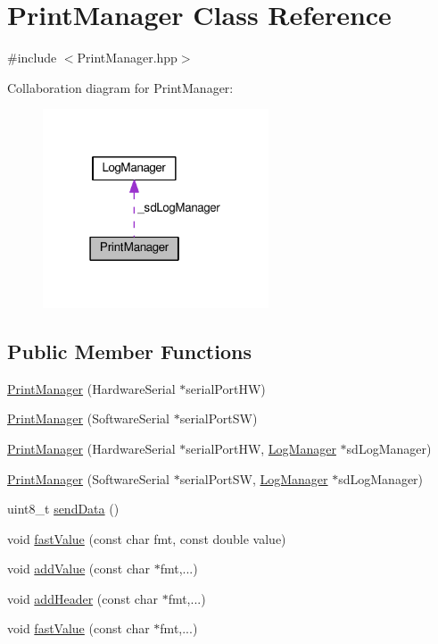 \hypertarget{class_print_manager}{}\section{Print\+Manager Class Reference}
\label{class_print_manager}


{\ttfamily \#include $<$Print\+Manager.\+hpp$>$}



Collaboration diagram for Print\+Manager\+:\nopagebreak
\begin{figure}[H]
\begin{center}
\leavevmode
\includegraphics[width=190pt]{class_print_manager__coll__graph}
\end{center}
\end{figure}
\subsection*{Public Member Functions}
\begin{DoxyCompactItemize}
\item 
\hyperlink{class_print_manager_a587a22b1cc67696f71f5a85bfb130140}{Print\+Manager} (Hardware\+Serial $\ast$serial\+Port\+HW)
\item 
\hyperlink{class_print_manager_ac1212bb44b3c100bd67041d878977058}{Print\+Manager} (Software\+Serial $\ast$serial\+Port\+SW)
\item 
\hyperlink{class_print_manager_a5ac22dd7ed0f35b12cd2b7650e2c8501}{Print\+Manager} (Hardware\+Serial $\ast$serial\+Port\+HW, \hyperlink{class_log_manager}{Log\+Manager} $\ast$sd\+Log\+Manager)
\item 
\hyperlink{class_print_manager_ac1a82b54cdeaf43b3e78ed6eb18c9bc6}{Print\+Manager} (Software\+Serial $\ast$serial\+Port\+SW, \hyperlink{class_log_manager}{Log\+Manager} $\ast$sd\+Log\+Manager)
\item 
uint8\+\_\+t \hyperlink{class_print_manager_a65b6e94eb17c08725d307293c26922c6}{send\+Data} ()
\item 
void \hyperlink{class_print_manager_aef5dd6437e06e84de5a98c1466f5f074}{fast\+Value} (const char fmt, const double value)
\item 
void \hyperlink{class_print_manager_a27ea0c1977a54e1291d0be0fc0754f48}{add\+Value} (const char $\ast$fmt,...)
\item 
void \hyperlink{class_print_manager_a9a44c89a9752e1e1f63bc174ce675f90}{add\+Header} (const char $\ast$fmt,...)
\item 
void \hyperlink{class_print_manager_ae091788c5f4baa9df10fb290c67cb693}{fast\+Value} (const char $\ast$fmt,...)
\end{DoxyCompactItemize}
